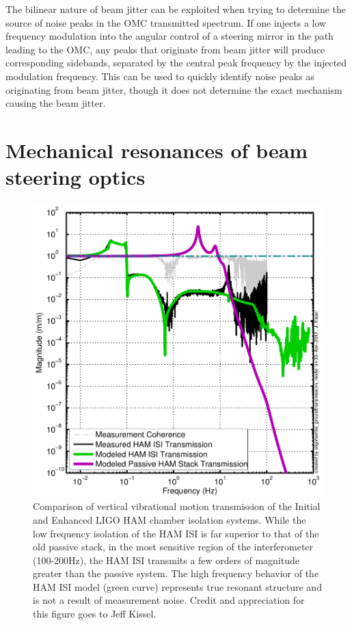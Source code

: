 The bilinear nature of beam jitter can be exploited when trying to determine the source of noise peaks in the OMC transmitted spectrum. %
If one injects a low frequency modulation into the angular control of a steering mirror in the path leading to the OMC, any peaks that originate from beam jitter will produce corresponding sidebands, separated by the central peak frequency by the injected modulation frequency. %
This can be used to quickly identify noise peaks as originating from beam jitter, though it does not determine the exact mechanism causing the beam jitter.

\section{Mechanical resonances of beam steering optics}

\begin{figure}
  \begin{center}
  \leavevmode
  \includegraphics{figs-jitter/hamtransmission.pdf}
  \end{center}
  \caption[Comparison of vertical vibrational motion transmission of the Initial and Enhanced LIGO HAM chamber isolation systems.]{Comparison of vertical vibrational motion transmission of the Initial and Enhanced LIGO HAM chamber isolation systems. While the low frequency isolation of the HAM ISI is far superior to that of the old passive stack, in the most sensitive region of the interferometer (100-200Hz), the HAM ISI transmits a few orders of magnitude greater than the passive system. The high frequency behavior of the HAM ISI model (green curve) represents true resonant structure and is not a result of measurement noise. Credit and appreciation for this figure goes to Jeff Kissel.}
  \label{fig:hamtransmission}
\end{figure}

